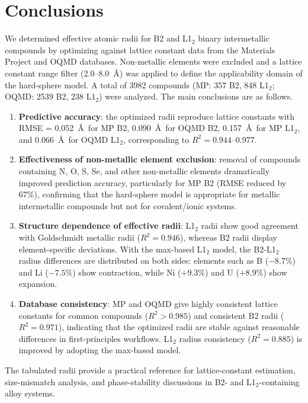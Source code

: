 \documentclass[a4paper,10pt,5p]{elsarticle}
\begin{document}
\section{Conclusions}
We determined effective atomic radii for B2 and L1$_2$ binary intermetallic compounds by optimizing against lattice constant data from the Materials Project and OQMD databases. Non-metallic elements were excluded and a lattice constant range filter (2.0--8.0~\AA) was applied to define the applicability domain of the hard-sphere model. A total of 3982 compounds (MP: 357 B2, 848 L1$_2$; OQMD: 2539 B2, 238 L1$_2$) were analyzed. The main conclusions are as follows.
\begin{enumerate}
    \item \textbf{Predictive accuracy}: the optimized radii reproduce lattice constants with RMSE = 0.052~\AA\ for MP B2, 0.090~\AA\ for OQMD B2, 0.157~\AA\ for MP L1$_2$, and 0.066~\AA\ for OQMD L1$_2$, corresponding to $R^2 = 0.944$--0.977.
    \item \textbf{Effectiveness of non-metallic element exclusion}: removal of compounds containing N, O, S, Se, and other non-metallic elements dramatically improved prediction accuracy, particularly for MP B2 (RMSE reduced by 67\%), confirming that the hard-sphere model is appropriate for metallic intermetallic compounds but not for covalent/ionic systems.
    \item \textbf{Structure dependence of effective radii}: L1$_2$ radii show good agreement with Goldschmidt metallic radii ($R^2 = 0.946$), whereas B2 radii display element-specific deviations. With the max-based L1$_2$ model, the B2-L1$_2$ radius differences are distributed on both sides: elements such as B ($-8.7$\%) and Li ($-7.5$\%) show contraction, while Ni ($+9.3$\%) and U ($+8.9$\%) show expansion.
    \item \textbf{Database consistency}: MP and OQMD give highly consistent lattice constants for common compounds ($R^2 > 0.985$) and consistent B2 radii ($R^2 = 0.971$), indicating that the optimized radii are stable against reasonable differences in first-principles workflows. L1$_2$ radius consistency ($R^2 = 0.885$) is improved by adopting the max-based model.
\end{enumerate}

The tabulated radii provide a practical reference for lattice-constant estimation, size-mismatch analysis, and phase-stability discussions in B2- and L1$_2$-containing alloy systems.


\end{document}

